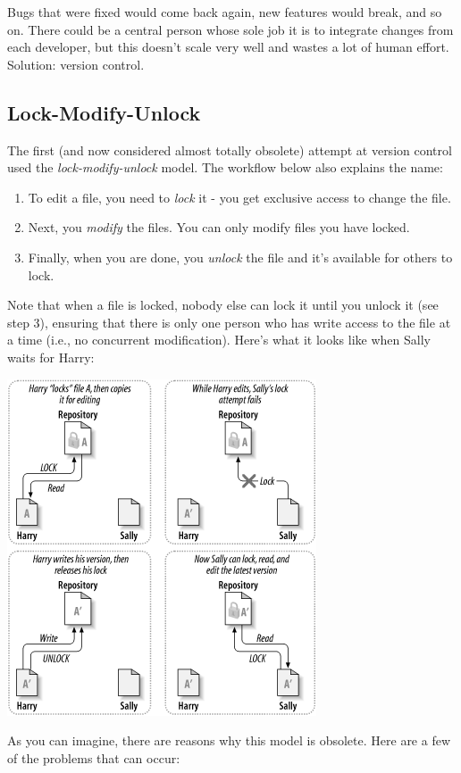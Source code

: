 Bugs that were fixed would come back again, new features would break, and so on. There could be a central person whose sole job it is to integrate changes from each developer, but this doesn't scale very well and wastes a lot of human effort. Solution: version control.

\subsection*{Lock-Modify-Unlock}

The first (and now considered almost totally obsolete) attempt at version control used the \emph{lock-modify-unlock} model. The workflow below also explains the name:

\begin{enumerate}
\item To edit a file, you need to \emph{lock} it - you get exclusive access to change the file.
	\item Next, you \emph{modify} the files. You can only modify files you have locked.
	\item Finally, when you are done, you \emph{unlock} the file and it's available for others to lock.
\end{enumerate}

Note that when a file is locked, nobody else can lock it until you unlock it (see step 3), ensuring that there is only one person who has write access to the file at a time (i.e., no concurrent modification). Here's what it looks like when Sally waits for Harry:

\begin{center}
	\includegraphics[width=.5\textwidth]{images/ch02dia3.png}
	~\cite{svnbook}
\end{center}

As you can imagine, there are reasons why this model is obsolete. Here are a few of the problems that can occur:

